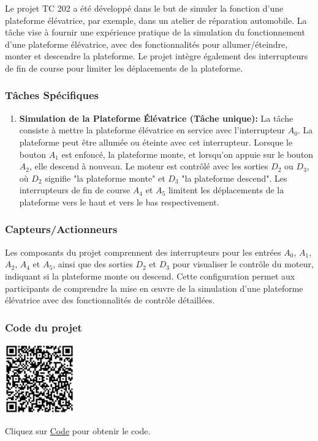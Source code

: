 \documentclass[a4paper,12pt]{report}
\begin{document}
Le projet TC 202 a été développé dans le but de simuler la fonction d'une plateforme élévatrice, par exemple, dans un atelier de réparation automobile. La tâche vise à fournir une expérience pratique de la simulation du fonctionnement d'une plateforme élévatrice, avec des fonctionnalités pour allumer/éteindre, monter et descendre la plateforme. Le projet intègre également des interrupteurs de fin de course pour limiter les déplacements de la plateforme.

\subsubsection{Tâches Spécifiques}

\begin{enumerate}
    \item \textbf{Simulation de la Plateforme Élévatrice (Tâche unique):} La tâche consiste à mettre la plateforme élévatrice en service avec l'interrupteur \(A_0\). La plateforme peut être allumée ou éteinte avec cet interrupteur. Lorsque le bouton \(A_1\) est enfoncé, la plateforme monte, et lorsqu'on appuie sur le bouton \(A_2\), elle descend à nouveau. Le moteur est contrôlé avec les sorties \(D_2\) ou \(D_3\), où \(D_2\) signifie "la plateforme monte" et \(D_3\) "la plateforme descend". Les interrupteurs de fin de course \(A_4\) et \(A_5\) limitent les déplacements de la plateforme vers le haut et vers le bas respectivement.
\end{enumerate}

\subsubsection{Capteurs/Actionneurs}

Les composants du projet comprennent des interrupteurs pour les entrées \(A_0\), \(A_1\), \(A_2\), \(A_4\) et \(A_5\), ainsi que des sorties \(D_2\) et \(D_3\) pour visualiser le contrôle du moteur, indiquant si la plateforme monte ou descend. Cette configuration permet aux participants de comprendre la mise en œuvre de la simulation d'une plateforme élévatrice avec des fonctionnalités de contrôle détaillées.

\subsubsection{Code du projet}

\begin{minipage}{0.5\textwidth}
    \includegraphics[height=3cm]{Code TC202.png}
\end{minipage}%
\begin{minipage}{0.5\textwidth}
    Cliquez sur \href{https://github.com/DexterTaha/Controllino-PLC-Sample/blob/main/TC200/TC202_Rampe_%C3%A9l%C3%A9vatrice/TC202_Rampe_%C3%A9l%C3%A9vatrice.ino}{Code} pour obtenir le code.
\end{minipage}
\end{document}
